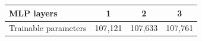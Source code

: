 \begin{tabular}{lccc}
\toprule
MLP layers & 1 & 2 & 3 \\
\midrule
Trainable parameters & 107,121 & 107,633 & 107,761 \\
\bottomrule
\end{tabular}